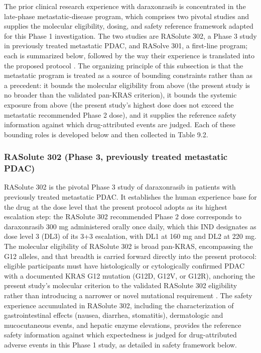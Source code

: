 The prior clinical research experience with daraxonrasib is concentrated in the
late-phase metastatic-disease program, which comprises two pivotal studies and
supplies the molecular eligibility, dosing, and safety reference framework adapted
for this Phase 1 investigation. The two studies are RASolute 302, a Phase 3 study
in previously treated metastatic PDAC, and RASolve 301, a first-line program; each
is summarized below, followed by the way their experience is translated into the
proposed protocol \cite{daraxwhipple, onpremwhippl}. The organizing principle of
this subsection is that the metastatic program is treated as a source of bounding
constraints rather than as a precedent: it bounds the molecular eligibility from
above (the present study is no broader than the validated pan-KRAS criterion), it
bounds the systemic exposure from above (the present study's highest dose does not
exceed the metastatic recommended Phase 2 dose), and it supplies the reference
safety information against which drug-attributed events are judged. Each of these
bounding roles is developed below and then collected in Table 9.2.

\subsubsection*{RASolute 302 (Phase 3, previously treated metastatic PDAC)}

RASolute 302 is the pivotal Phase 3 study of daraxonrasib in patients with
previously treated metastatic PDAC. It establishes the human experience base for
the drug at the dose level that the present protocol adopts as its highest
escalation step: the RASolute 302 recommended Phase 2 dose corresponds to
daraxonrasib 300 mg administered orally once daily, which this IND designates as
dose level 3 (DL3) of its 3+3 escalation, with DL1 at 160 mg and DL2 at 220 mg.
The molecular eligibility of RASolute 302 is broad pan-KRAS, encompassing the G12
alleles, and that breadth is carried forward directly into the present protocol:
eligible participants must have histologically or cytologically confirmed PDAC
with a documented KRAS G12 mutation (G12D, G12V, or G12R), anchoring the present
study's molecular criterion to the validated RASolute 302 eligibility rather than
introducing a narrower or novel mutational requirement \cite{daraxwhipple}. The
safety experience accumulated in RASolute 302, including the characterization of
gastrointestinal effects (nausea, diarrhea, stomatitis), dermatologic and
mucocutaneous events, and hepatic enzyme elevations, provides the reference safety
information against which expectedness is judged for drug-attributed adverse events
in this Phase 1 study, as detailed in safety framework below.

